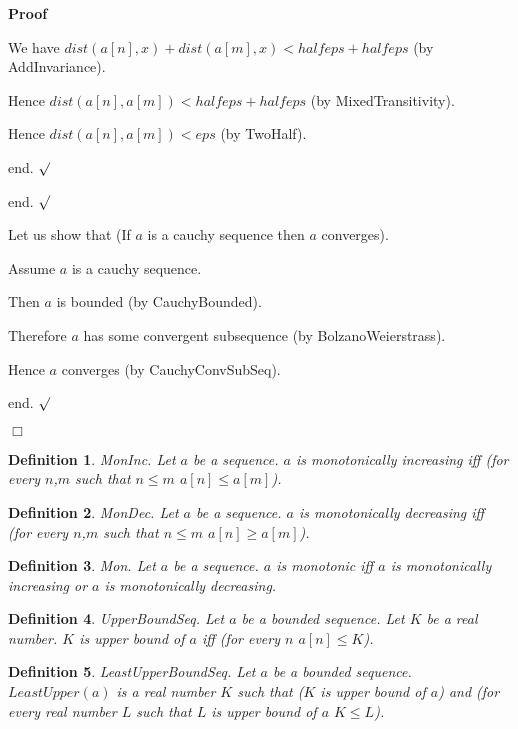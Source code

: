 \documentclass{article}
\newenvironment{forthel}{\begin{leftbar}}{\end{leftbar}}
\newenvironment{proof}{\noindent\textbf{Proof\ }}{\hspace*{\fill}$\Box$\medskip}
\newenvironment{subproof}{\begin{list}{}{}
		\item[\text{Proof}]}{\hfill $\surd$ \end{list}}
\newtheorem{definition}{Definition}
\begin{document}
\begin{forthel}
\begin{proof}
\begin{subproof}
\begin{subproof}
				We have $dist(a[n],x) + dist(a[m],x) < halfeps + halfeps$ (by AddInvariance).
				
				Hence $dist(a[n],a[m]) < halfeps + halfeps$ (by MixedTransitivity).
				
				Hence $dist(a[n],a[m]) < eps$ (by TwoHalf).
				
				end.
			\end{subproof}
			
			end.
		\end{subproof}
		
		Let us show that (If $a$ is a cauchy sequence then $a$ converges).
		
		\begin{subproof}
			Assume $a$ is a cauchy sequence.
			
			Then $a$ is bounded (by CauchyBounded).
			
			Therefore $a$ has some convergent subsequence (by BolzanoWeierstrass).
			
			Hence $a$ converges (by CauchyConvSubSeq).
			
			end.
		\end{subproof}
	\end{proof}
	
	
	\begin{definition}
		MonInc.
		Let $a$ be a sequence. $a$ is monotonically increasing iff (for every $n$,$m$ such that $n \leq m$ $a[n] \leq a[m]$).
	\end{definition}

	\begin{definition}
		MonDec.
		Let $a$ be a sequence. $a$ is monotonically decreasing iff (for every $n$,$m$ such that $n \leq m$ $a[n] \geq a[m]$).
	\end{definition}
	
	\begin{definition}
		Mon.
		Let $a$ be a sequence. $a$ is monotonic iff $a$ is monotonically increasing or $a$ is monotonically decreasing.
	\end{definition}
	
	\begin{definition}
		UpperBoundSeq.
		Let $a$ be a bounded sequence. Let $K$ be a real number. $K$ is upper bound of $a$ iff (for every $n$ $a[n] \leq K$).
	\end{definition}
	
	\begin{definition}
		LeastUpperBoundSeq.
		Let $a$ be a bounded sequence. $LeastUpper(a)$ is a real number $K$ such that ($K$ is upper bound of $a$) and 
		(for every real number $L$ such that $L$ is upper bound of $a$ $K \leq L$).
	\end{definition}
	

\end{forthel}
\end{document}

